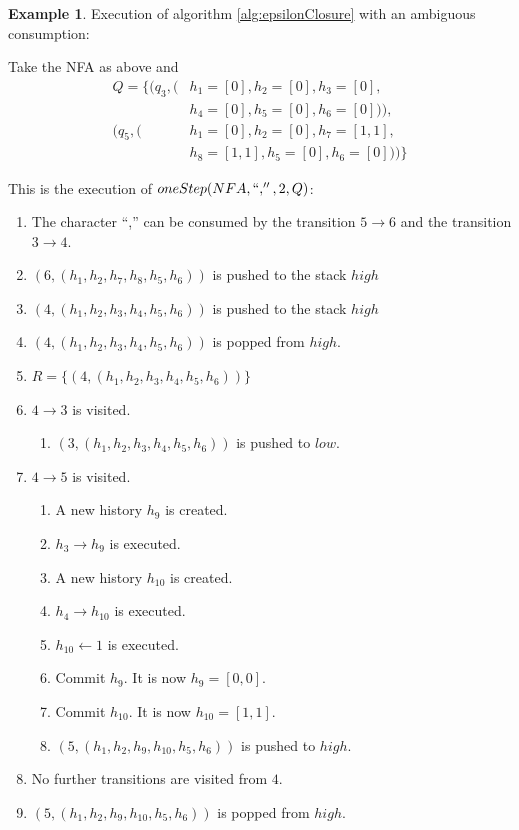 \documentclass[english]{sigplanconf}
\theoremstyle{definition}
\newtheorem{example}{Example}[section]
\begin{document}
\begin{example} Execution of algorithm \ref{alg:epsilonClosure} with an ambiguous consumption:

Take the NFA as above and 
\begin{align*}
Q=\{
	(q_3, (&h_1=[0], h_2=[0], h_3=[0], \\
	&h_4=[0], h_5=[0], h_6=[0])),\\
	(q_5, (&h_1=[0], h_2=[0], h_7=[1,1],\\ 
	&h_8=[1,1], h_5=[0], h_6=[0]))\}
\end{align*}

This is the execution of $oneStep(NFA, ``,'', 2, Q)$:
\begin{enumerate}
\item The character ``,'' can be consumed by the transition $5\rightarrow 6$ and the transition $3\rightarrow 4$.
\item $(6, (h_1, h_2, h_7, h_8, h_5, h_6))$ is pushed to the stack $high$
\item $(4, (h_1, h_2, h_3, h_4, h_5, h_6))$ is pushed to the stack $high$
\item $(4, (h_1, h_2, h_3, h_4, h_5, h_6))$ is popped from $high$.
\item $R=\{(4, (h_1, h_2, h_3, h_4, h_5, h_6))\}$
\item $4\rightarrow 3$ is visited. \begin{enumerate}
	\item $(3, (h_1, h_2, h_3, h_4, h_5, h_6))$ is pushed to $low$.
\end{enumerate}
\item $4\rightarrow 5$ is visited. \begin{enumerate}
	\item A new history $h_9$ is created.
	\item $h_3\rightarrow h_9$ is executed.
	\item A new history $h_{10}$ is created.
	\item $h_4\rightarrow h_{10}$ is executed.
	\item $h_{10} \leftarrow 1$ is executed.
	\item Commit $h_9$. It is now $h_9=[0,0]$.
	\item Commit $h_{10}$. It is now $h_{10}=[1,1]$.
	\item $(5, (h_1, h_2, h_9, h_{10}, h_5, h_6))$ is pushed to $high$.
\end{enumerate}
\item No further transitions are visited from $4$.
\item $(5, (h_1, h_2, h_9, h_{10}, h_5, h_6))$ is popped from $high$.

\end{enumerate}
\end{example}
\end{document}
